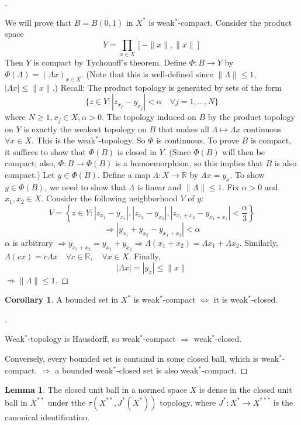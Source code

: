 \documentclass{article}
\theoremstyle{definition}
\newtheorem{lem}{Lemma}
\newtheorem{cor}{Corollary}
\newenvironment{proofs}[1][\proofname]{%
  \begin{proof}[#1]$ $\par\nobreak\ignorespaces
}{%
  \end{proof}
}
\newcommand{\RR}{\mathbb R}
\newcommand{\Ra}{\Rightarrow}
\newcommand{\Lra}{\Leftrightarrow}
\begin{document}
\begin{proofs}
	We will prove that $B = \overline{B(0, 1)}$ in $X^*$ is weak$^*$-compact.
	Consider the product space
	\[
		Y = \prod_{x \in X} [-\|x\|, \|x\|]
	\]
	Then $Y$ is compact by Tychonoff's theorem.
	Define $\Phi: B \to Y$ by $\Phi(\Lambda) = (\Lambda x)_{x \in X}$.
	(Note that this is well-defined since $\|\Lambda\| \leq 1$, $|\Lambda x| \leq \|x\|$.)
	Recall: The product topology is generated by sets of the form
	\[
		\{z \in Y: |z_{x_j} - y_{x_j}| < \alpha \quad \forall j = 1, ..., N\}
	\]
	where $N \geq 1, x_j \in X, \alpha > 0$.
	The topology induced on $B$ by the product topology on $Y$ is exactly the weakest topology on $B$ that makes all $\Lambda \mapsto \Lambda x$ continuous $\forall x \in X$.
	This is the weak$^*$-topology.
	So $\Phi$ is continuous.
	To prove $B$ is compact, it suffices to show that $\Phi(B)$ is closed in $Y$.
	(Since $\Phi(B)$ will then be compact; 
	also, $\Phi: B \to \Phi(B)$ is a homoemorphism, so this implies that $B$ is also compact.)
	Let $y \in \overline{\Phi(B)}$.
	Define a map $\Lambda: X \to \RR$ by $\Lambda x = y_x$.
	To show $y \in \Phi(B)$, we need to show that $\Lambda$ is linear and $\|\Lambda\| \leq 1$.
	Fix $\alpha > 0$ and $x_1, x_2 \in X$.
	Consider the following neighborhood $V$ of $y$:
	\[
		V = \left\{z \in Y: |z_{x_1} - y_{x_1}|, |z_{x_2} - y_{x_2}|, |z_{x_1 + x_2} - y_{x_1 + x_2}| < \frac{\alpha}{3} \right\}
	\]
	\[
		\Ra |y_{x_1} + y_{x_2} - y_{x_1 + x_2}| < \alpha
	\]
	$\alpha$ is arbitrary $\Ra y_{x_1 + x_2} = y_{x_1} + y_{x_2} \Ra \Lambda (x_1 + x_2) = \Lambda x_1 + \Lambda x_2$.
	Similarly, $\Lambda (cx) = c \Lambda x \quad \forall c \in \RR, \quad \forall x \in X$.
	Finally, 
	\[
		|\Lambda x| = |y_x| \leq \|x\|
	\]
	$\Ra \|\Lambda\| \leq 1$.
\end{proofs}

\begin{cor}
	A bounded set in $X^*$ is weak$^*$-compact $\Lra$ it is weak$^*$-closed.
\end{cor}

\begin{proofs}
	Weak$^*$-topology is Hausdorff, so weak$^*$-compact $\Ra$ weak$^*$-closed.

	\par Conversely, every bounded set is containd in some closed ball, which is weak$^*$-compact.
	$\Ra$ a bounded weak$^*$-closed set is also weak$^*$-compact.
\end{proofs}

\begin{lem}
	The closed unit ball in a normed space $X$ is dense in the closed unit ball in $X^{**}$ under tthe $\tau(X^{**}, J^*(X^*))$ topology, where $J^*: X^* \to X^{***}$ is the canonical identification.
\end{lem}
\end{document}
